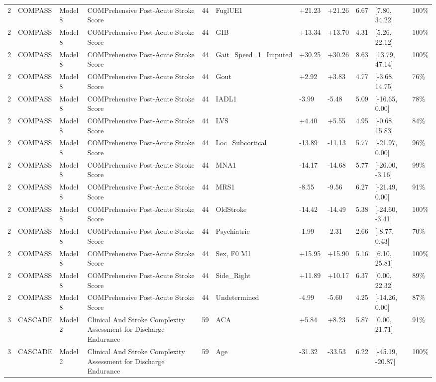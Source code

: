 \begin{tabular}{lllllllllll}
2 & COMPASS & Model 8 & COMPrehensive Post-Acute Stroke Score & 44 & FuglUE1 & +21.23 & +21.26 & 6.67 & [7.80, 34.22] & 100\% \\
2 & COMPASS & Model 8 & COMPrehensive Post-Acute Stroke Score & 44 & GIB & +13.34 & +13.70 & 4.31 & [5.26, 22.12] & 100\% \\
2 & COMPASS & Model 8 & COMPrehensive Post-Acute Stroke Score & 44 & Gait\_Speed\_1\_Imputed & +30.25 & +30.26 & 8.63 & [13.79, 47.14] & 100\% \\
2 & COMPASS & Model 8 & COMPrehensive Post-Acute Stroke Score & 44 & Gout & +2.92 & +3.83 & 4.77 & [-3.68, 14.75] & 76\% \\
2 & COMPASS & Model 8 & COMPrehensive Post-Acute Stroke Score & 44 & IADL1 & -3.99 & -5.48 & 5.09 & [-16.65, 0.00] & 78\% \\
2 & COMPASS & Model 8 & COMPrehensive Post-Acute Stroke Score & 44 & LVS & +4.40 & +5.55 & 4.95 & [-0.68, 15.83] & 84\% \\
2 & COMPASS & Model 8 & COMPrehensive Post-Acute Stroke Score & 44 & Loc\_Subcortical & -13.89 & -11.13 & 5.77 & [-21.97, 0.00] & 96\% \\
2 & COMPASS & Model 8 & COMPrehensive Post-Acute Stroke Score & 44 & MNA1 & -14.17 & -14.68 & 5.77 & [-26.00, -3.16] & 99\% \\
2 & COMPASS & Model 8 & COMPrehensive Post-Acute Stroke Score & 44 & MRS1 & -8.55 & -9.56 & 6.27 & [-21.49, 0.00] & 91\% \\
2 & COMPASS & Model 8 & COMPrehensive Post-Acute Stroke Score & 44 & OldStroke & -14.42 & -14.49 & 5.38 & [-24.60, -3.41] & 100\% \\
2 & COMPASS & Model 8 & COMPrehensive Post-Acute Stroke Score & 44 & Psychiatric & -1.99 & -2.31 & 2.66 & [-8.77, 0.43] & 70\% \\
2 & COMPASS & Model 8 & COMPrehensive Post-Acute Stroke Score & 44 & Sex, F0 M1 & +15.95 & +15.90 & 5.16 & [6.10, 25.81] & 100\% \\
2 & COMPASS & Model 8 & COMPrehensive Post-Acute Stroke Score & 44 & Side\_Right & +11.89 & +10.17 & 6.37 & [0.00, 22.32] & 89\% \\
2 & COMPASS & Model 8 & COMPrehensive Post-Acute Stroke Score & 44 & Undetermined & -4.99 & -5.60 & 4.25 & [-14.26, 0.00] & 87\% \\
3 & CASCADE & Model 2 & Clinical And Stroke Complexity Assessment for Discharge Endurance & 59 & ACA & +5.84 & +8.23 & 5.87 & [0.00, 21.71] & 91\% \\
3 & CASCADE & Model 2 & Clinical And Stroke Complexity Assessment for Discharge Endurance & 59 & Age & -31.32 & -33.53 & 6.22 & [-45.19, -20.87] & 100\% \\

\end{tabular}
